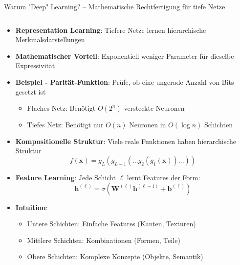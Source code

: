 \documentclass[aspectratio=1610, xcolor=dvipsnames, 9pt]{beamer}
\begin{document}
\begin{frame}{Warum "Deep" Learning? -- Mathematische Rechtfertigung für tiefe Netze}
  \begin{columns}
    \begin{column}{1\textwidth}
      \begin{itemize}
        \item \textbf{Representation Learning}: Tiefere Netze lernen hierarchische Merkmalsdarstellungen
        \item \textbf{Mathematischer Vorteil}: Exponentiell weniger Parameter für dieselbe Expressivität
        \item \textbf{Beispiel - Parität-Funktion}: Prüfe, ob eine ungerade Anzahl von Bits gesetzt ist
        \begin{itemize}
          \item Flaches Netz: Benötigt $O(2^n)$ versteckte Neuronen
          \item Tiefes Netz: Benötigt nur $O(n)$ Neuronen in $O(\log n)$ Schichten
        \end{itemize}
        \item \textbf{Kompositionelle Struktur}: Viele reale Funktionen haben hierarchische Struktur
        \begin{equation}
          f(\mathbf{x}) = g_L(g_{L-1}(...g_2(g_1(\mathbf{x}))...))
        \end{equation}
        \item \textbf{Feature Learning}: Jede Schicht $\ell$ lernt Features der Form:
        \begin{equation}
          \mathbf{h}^{(\ell)} = \sigma(\mathbf{W}^{(\ell)} \mathbf{h}^{(\ell-1)} + \mathbf{b}^{(\ell)})
        \end{equation}
        \item \textbf{Intuition}: 
        \begin{itemize}
          \item Untere Schichten: Einfache Features (Kanten, Texturen)
          \item Mittlere Schichten: Kombinationen (Formen, Teile)
          \item Obere Schichten: Komplexe Konzepte (Objekte, Semantik)
        \end{itemize}
      \end{itemize}
    \end{column}
  \end{columns}
\end{frame}
\end{document}
